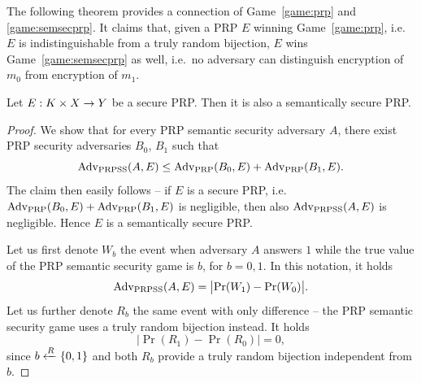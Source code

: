 The following theorem provides a connection of Game~\ref{game:prp} and \ref{game:semsecprp}. It claims that, given a PRP $E$ winning Game~\ref{game:prp}, i.e.\ $E$ is indistinguishable from a truly random bijection, $E$ wins Game~\ref{game:semsecprp} as well, i.e.\ no adversary can distinguish encryption of $m_0$ from encryption of $m_1$.

\begin{thm}
\label{thm:semsecprp}
	Let $E: K\times X\rightarrow Y$ be a secure PRP. Then it is also a semantically secure PRP.
\end{thm}
\begin{proof}
	We show that for every PRP semantic security adversary $A$, there exist PRP security adversaries $B_0$, $B_1$ such that
	\begin{equation}
	\label{eq:aleqbb}
		\operatorname*{Adv_{PRPSS}}(A,E) \leq \operatorname*{Adv_{PRP}}(B_0,E) + \operatorname*{Adv_{PRP}}(B_1,E) .
	\end{equation}
	The claim then easily follows -- if $E$ is a secure PRP, i.e.\ $\operatorname*{Adv_{PRP}}(B_0,E) + \operatorname*{Adv_{PRP}}(B_1,E)$ is negligible, then also $\operatorname*{Adv_{PRPSS}}(A,E)$ is negligible. Hence $E$ is a semantically secure PRP.
	
	Let us first denote $W_b$ the event when adversary $A$ answers $1$ while the true value of the PRP semantic security game is $b$, for $b=0,1$. In this notation, it holds
	\begin{equation}
	\label{eq:prpssae}
		\operatorname*{Adv_{PRPSS}}(A,E) = \bigl| \Pr(W_1) - \Pr(W_0) \bigr| .
	\end{equation}
	Let us further denote $R_b$ the same event with only difference -- the PRP semantic security game uses a truly random bijection instead. It holds
	\begin{equation}
	\label{eq:rr0}
		\bigl| \Pr(R_1) - \Pr(R_0) \bigr| = 0 ,
	\end{equation}
	since $b\xleftarrow{R}\{0,1\}$ and both $R_b$ provide a truly random bijection independent from $b$.
	

\end{proof}
